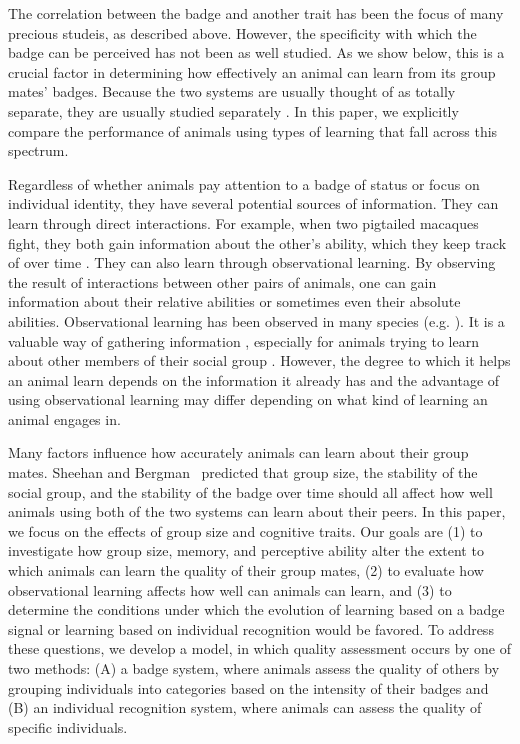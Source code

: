 The correlation between the badge and another trait has been the focus of many precious studeis, as described above. However, the specificity with which the badge can be perceived has not been as well studied. As we show below, this is a crucial factor in determining how effectively an animal can learn from its group mates' badges. Because the two systems are usually thought of as totally separate, they are usually studied separately \citep{sheehan2016evotradeoff}. In this paper, we explicitly compare the performance of animals using types of learning that fall across this spectrum.


Regardless of whether animals pay attention to a badge of status or focus on individual identity, they have several potential sources of information. They can learn through direct interactions. For example, when two pigtailed macaques fight, they both gain information about the other's ability, which they keep track of over time \citep{Flack:2006uq}. They can also learn through observational learning. By observing the result of interactions between other pairs of animals, one can gain information about their relative abilities or sometimes even their absolute abilities. Observational learning has been observed in many species (e.g. \citep{Gaudet:1984cr,Holekamp:1991nx,Fiorito:1992ve,Marchetti:2000dq,Bugnyar:2002qf,Hopper:2008bh,Hobson:2015uq}). It is a valuable way of gathering information \citep{Holekamp:1991nx,Schaik:2011oq,Seyfarth2015SocialCognition}, especially for animals trying to learn about other members of their social group \citep{Freeman:1985kl,Holekamp:1991nx,Hobson:2015uq}. However, the degree to which it helps an animal learn depends on the information it already has and the advantage of using observational learning may differ depending on what kind of learning an animal engages in.


Many factors influence how accurately animals can learn about their group mates. Sheehan and Bergman~\citep{sheehan2016evotradeoff} predicted that group size, the stability of the social group, and the stability of the badge over time should all affect how well animals using both of the two systems can learn about their peers. In this paper, we focus on the effects of group size and cognitive traits. Our goals are (1) to investigate how group size, memory, and perceptive ability alter the extent to which animals can learn the quality of their group mates, (2) to evaluate how observational learning affects how well can animals can learn, and (3) to determine the conditions under which the evolution of learning based on a badge signal or learning based on individual recognition would be favored. To address these questions, we develop a model, in which quality assessment occurs by one of two methods: (A) a badge system, where animals assess the quality of others by grouping individuals into categories based on the intensity of their badges and (B) an individual recognition system, where animals can assess the quality of specific individuals.  


